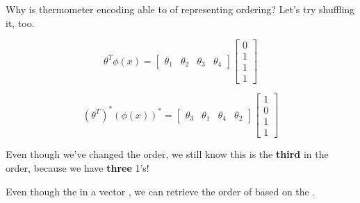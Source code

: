                 Why is thermometer encoding able to of representing ordering? Let's try shuffling it, too.

                \begin{equation}
                    \theta^T \phi(x) = 
                    \begin{bmatrix}
                        \theta_1 & \theta_2 & \theta_3 & \theta_4
                    \end{bmatrix}
                    \begin{bmatrix}
                        0\\1\\1\\1
                    \end{bmatrix}
                \end{equation}

                \begin{equation}
                    (\theta^T)^* (\phi(x))^* = 
                    \begin{bmatrix}
                        \theta_3 & \theta_1 & \theta_4 & \theta_2
                    \end{bmatrix}
                    \begin{bmatrix}
                        1 \\ 0 \\ 1 \\ 1
                    \end{bmatrix}
                \end{equation}

                Even though we've changed the order, we still know this is the \textbf{third} in the order, because we have \textbf{three} 1's!\\

                \begin{concept}
                    Even though the  in a vector , we can retrieve the order of  based on the .
                \end{concept}
            
